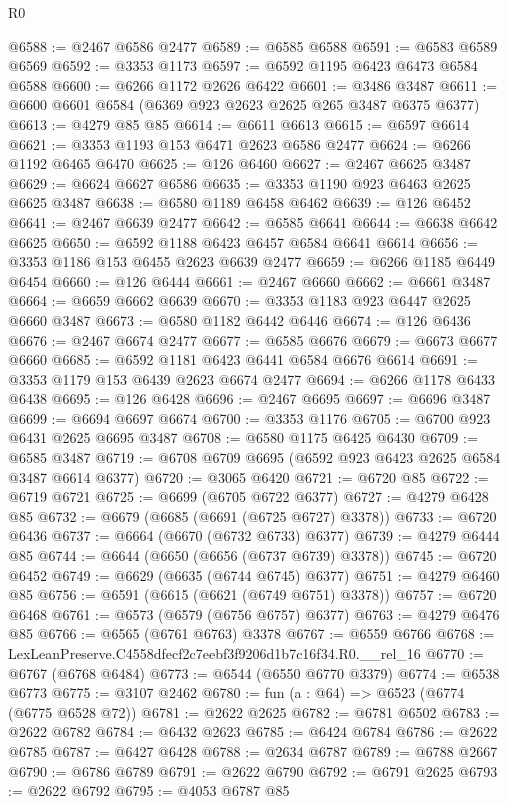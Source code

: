 \begin{lexlean}{R0}
\begin{coremodule}
@6588 := @2467 @6586 @2477
@6589 := @6585 @6588
@6591 := @6583 @6589 @6569
@6592 := @3353 @1173
@6597 := @6592 @1195 @6423 @6473 @6584 @6588
@6600 := @6266 @1172 @2626 @6422
@6601 := @3486 @3487
@6611 := @6600 @6601 @6584 (@6369 @923 @2623 @2625 @265 @3487 @6375 @6377)
@6613 := @4279 @85 @85
@6614 := @6611 @6613
@6615 := @6597 @6614
@6621 := @3353 @1193 @153 @6471 @2623 @6586 @2477
@6624 := @6266 @1192 @6465 @6470
@6625 := @126 @6460
@6627 := @2467 @6625 @3487
@6629 := @6624 @6627 @6586
@6635 := @3353 @1190 @923 @6463 @2625 @6625 @3487
@6638 := @6580 @1189 @6458 @6462
@6639 := @126 @6452
@6641 := @2467 @6639 @2477
@6642 := @6585 @6641
@6644 := @6638 @6642 @6625
@6650 := @6592 @1188 @6423 @6457 @6584 @6641 @6614
@6656 := @3353 @1186 @153 @6455 @2623 @6639 @2477
@6659 := @6266 @1185 @6449 @6454
@6660 := @126 @6444
@6661 := @2467 @6660
@6662 := @6661 @3487
@6664 := @6659 @6662 @6639
@6670 := @3353 @1183 @923 @6447 @2625 @6660 @3487
@6673 := @6580 @1182 @6442 @6446
@6674 := @126 @6436
@6676 := @2467 @6674 @2477
@6677 := @6585 @6676
@6679 := @6673 @6677 @6660
@6685 := @6592 @1181 @6423 @6441 @6584 @6676 @6614
@6691 := @3353 @1179 @153 @6439 @2623 @6674 @2477
@6694 := @6266 @1178 @6433 @6438
@6695 := @126 @6428
@6696 := @2467 @6695
@6697 := @6696 @3487
@6699 := @6694 @6697 @6674
@6700 := @3353 @1176
@6705 := @6700 @923 @6431 @2625 @6695 @3487
@6708 := @6580 @1175 @6425 @6430
@6709 := @6585 @3487
@6719 := @6708 @6709 @6695 (@6592 @923 @6423 @2625 @6584 @3487 @6614 @6377)
@6720 := @3065 @6420
@6721 := @6720 @85
@6722 := @6719 @6721
@6725 := @6699 (@6705 @6722 @6377)
@6727 := @4279 @6428 @85
@6732 := @6679 (@6685 (@6691 (@6725 @6727) @3378))
@6733 := @6720 @6436
@6737 := @6664 (@6670 (@6732 @6733) @6377)
@6739 := @4279 @6444 @85
@6744 := @6644 (@6650 (@6656 (@6737 @6739) @3378))
@6745 := @6720 @6452
@6749 := @6629 (@6635 (@6744 @6745) @6377)
@6751 := @4279 @6460 @85
@6756 := @6591 (@6615 (@6621 (@6749 @6751) @3378))
@6757 := @6720 @6468
@6761 := @6573 (@6579 (@6756 @6757) @6377)
@6763 := @4279 @6476 @85
@6766 := @6565 (@6761 @6763) @3378
@6767 := @6559 @6766
@6768 := LexLeanPreserve.C4558dfecf2c7eebf3f9206d1b7c16f34.R0.__rel_16
@6770 := @6767 (@6768 @6484)
@6773 := @6544 (@6550 @6770 @3379)
@6774 := @6538 @6773
@6775 := @3107 @2462
@6780 := fun (a : @64) => @6523 (@6774 (@6775 @6528 @72))
@6781 := @2622 @2625
@6782 := @6781 @6502
@6783 := @2622 @6782
@6784 := @6432 @2623
@6785 := @6424 @6784
@6786 := @2622 @6785
@6787 := @6427 @6428
@6788 := @2634 @6787
@6789 := @6788 @2667
@6790 := @6786 @6789
@6791 := @2622 @6790
@6792 := @6791 @2625
@6793 := @2622 @6792
@6795 := @4053 @6787 @85

\end{coremodule}
\end{lexlean}
